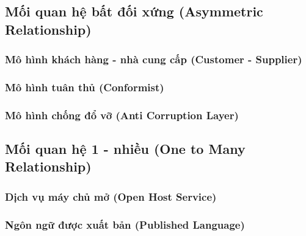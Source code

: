 \documentclass{report} %
\begin{document}
\subsection{Mối quan hệ bất đối xứng (Asymmetric Relationship)}
% 
\subsubsection{Mô hình khách hàng - nhà cung cấp (Customer - Supplier)}
% 
\subsubsection{Mô hình tuân thủ (Conformist)}
% 
\subsubsection{Mô hình chống đổ vỡ (Anti Corruption Layer)}
% 

\subsection{Mối quan hệ 1 - nhiều (One to Many Relationship)}
% 
\subsubsection{Dịch vụ máy chủ mở (Open Host Service)}
% 
\subsubsection{Ngôn ngữ được xuất bản (Published Language)}
% 


\end{document}
